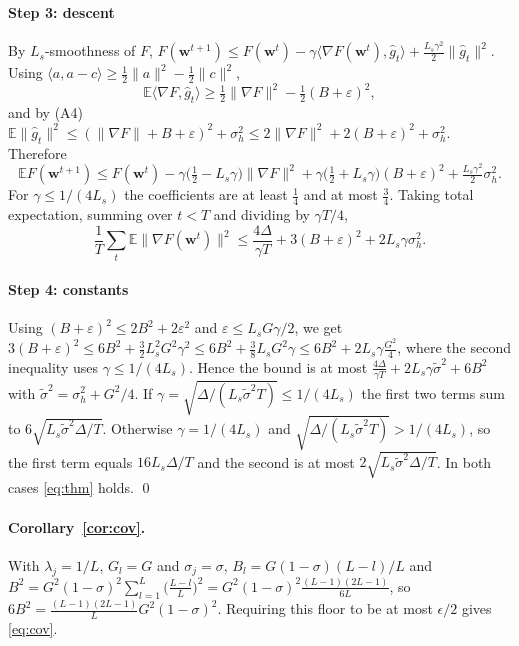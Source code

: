 \paragraph{Step 3: descent}
By $L_s$-smoothness of $F$, $F(\mathbf w^{t+1})\le F(\mathbf w^t)-\gamma\langle\nabla F(\mathbf w^t),\hat g_t\rangle+\frac{L_s\gamma^2}{2}\|\hat g_t\|^2$. Using $\langle a,a-c\rangle\ge\frac12\|a\|^2-\frac12\|c\|^2$,
\[
\mathbb E\langle\nabla F,\hat g_t\rangle\ge\tfrac12\|\nabla F\|^2-\tfrac12(B+\varepsilon)^2 ,
\]
and by (A4) $\mathbb E\|\hat g_t\|^2\le(\|\nabla F\|+B+\varepsilon)^2+\sigma_h^2\le2\|\nabla F\|^2+2(B+\varepsilon)^2+\sigma_h^2$. Therefore
\[
\mathbb EF(\mathbf w^{t+1})\le F(\mathbf w^t)-\gamma\big(\tfrac12-L_s\gamma\big)\|\nabla F\|^2+\gamma\big(\tfrac12+L_s\gamma\big)(B+\varepsilon)^2+\tfrac{L_s\gamma^2}{2}\sigma_h^2 .
\]
For $\gamma\le1/(4L_s)$ the coefficients are at least $\frac14$ and at most $\frac34$. Taking total expectation, summing over $t<T$ and dividing by $\gamma T/4$,
\[
\frac1T\sum_t\mathbb E\|\nabla F(\mathbf w^t)\|^2\le\frac{4\Delta}{\gamma T}+3(B+\varepsilon)^2+2L_s\gamma\sigma_h^2 .
\]

\paragraph{Step 4: constants}
Using $(B+\varepsilon)^2\le2B^2+2\varepsilon^2$ and $\varepsilon\le L_sG\gamma/2$, we get $3(B+\varepsilon)^2\le6B^2+\frac32L_s^2G^2\gamma^2\le6B^2+\frac38L_sG^2\gamma\le6B^2+2L_s\gamma\frac{G^2}4$, where the second inequality uses $\gamma\le1/(4L_s)$. Hence the bound is at most $\frac{4\Delta}{\gamma T}+2L_s\gamma\tilde\sigma^2+6B^2$ with $\tilde\sigma^2=\sigma_h^2+G^2/4$. If $\gamma=\sqrt{\Delta/(L_s\tilde\sigma^2T)}\le1/(4L_s)$ the first two terms sum to $6\sqrt{L_s\tilde\sigma^2\Delta/T}$. Otherwise $\gamma=1/(4L_s)$ and $\sqrt{\Delta/(L_s\tilde\sigma^2T)}>1/(4L_s)$, so the first term equals $16L_s\Delta/T$ and the second is at most $2\sqrt{L_s\tilde\sigma^2\Delta/T}$. In both cases \eqref{eq:thm} holds. \qed

\paragraph{Corollary~\ref{cor:cov}.}
With $\lambda_j=1/L$, $G_l=G$ and $\sigma_j=\sigma$, $B_l=G(1-\sigma)(L-l)/L$ and $B^2=G^2(1-\sigma)^2\sum_{l=1}^{L}\big(\tfrac{L-l}{L}\big)^2=G^2(1-\sigma)^2\tfrac{(L-1)(2L-1)}{6L}$, so $6B^2=\tfrac{(L-1)(2L-1)}{L}G^2(1-\sigma)^2$. Requiring this floor to be at most $\epsilon/2$ gives \eqref{eq:cov}.
